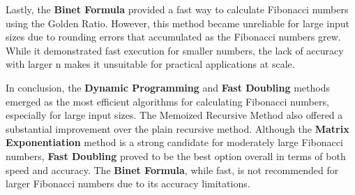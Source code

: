 \documentclass[a4paper, 12pt]{article}
\begin{document}
Lastly, the \textbf{\textbf{Binet Formula}} provided a fast way to calculate Fibonacci numbers using the Golden Ratio. However, this method became unreliable for large input sizes due to rounding errors that accumulated as the Fibonacci numbers grew. While it demonstrated fast execution for smaller numbers, the lack of accuracy with larger n makes it unsuitable for practical applications at scale.

In conclusion, the \textbf{\textbf{Dynamic Programming}} and \textbf{\textbf{Fast Doubling}} methods emerged as the most efficient algorithms for calculating Fibonacci numbers, especially for large input sizes. The Memoized Recursive Method also offered a substantial improvement over the plain recursive method. Although the \textbf{\textbf{Matrix Exponentiation}} method is a strong candidate for moderately large Fibonacci numbers, \textbf{\textbf{Fast Doubling}} proved to be the best option overall in terms of both speed and accuracy. The \textbf{\textbf{Binet Formula}}, while fast, is not recommended for larger Fibonacci numbers due to its accuracy limitations.
\end{document}
